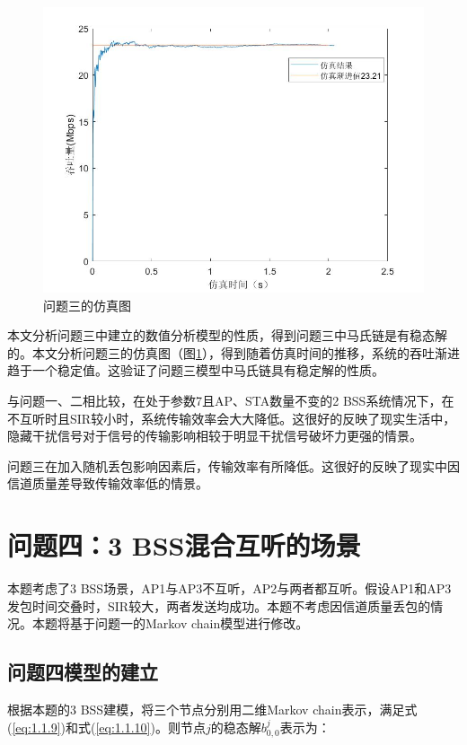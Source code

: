 \documentclass[bwprint]{gmcmthesis}
\begin{document}
\begin{figure}[H]
    \centering
    \includegraphics[width=.9\textwidth]{figures/q3.png}
    \caption{问题三的仿真图}
    \label{fig:q3}
\end{figure}

本文分析问题三中建立的数值分析模型的性质，得到问题三中马氏链是有稳态解的。本文分析问题三的仿真图（图\ref{fig:q3}），得到随着仿真时间的推移，系统的吞吐渐进趋于一个稳定值。这验证了问题三模型中马氏链具有稳定解的性质。

与问题一、二相比较，在处于参数7且AP、STA数量不变的2 BSS系统情况下，在不互听时且SIR较小时，系统传输效率会大大降低。这很好的反映了现实生活中，隐藏干扰信号对于信号的传输影响相较于明显干扰信号破坏力更强的情景。

问题三在加入随机丢包影响因素后，传输效率有所降低。这很好的反映了现实中因信道质量差导致传输效率低的情景。

\section{问题四：3 BSS混合互听的场景}

本题考虑了3 BSS场景，AP1与AP3不互听，AP2与两者都互听。假设AP1和AP3发包时间交叠时，SIR较大，两者发送均成功。本题不考虑因信道质量丢包的情况。本题将基于问题一的Markov chain模型进行修改。

\subsection{问题四模型的建立}

根据本题的3 BSS建模，将三个节点分别用二维Markov chain表示\cite{cite4}，满足式(\ref{eq:1.1.9})和式(\ref{eq:1.1.10})。则节点$j$的稳态解$b_{0,0}^j$表示为：
\end{document}
